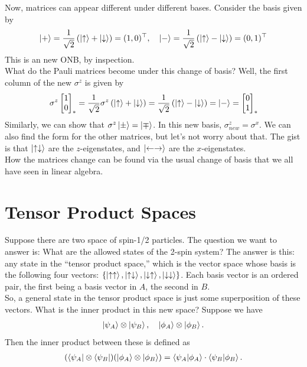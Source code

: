 \documentclass{book}
\theoremstyle{definition}
\newcommand{\f}[2]{\frac{#1}{#2}}
\newcommand{\lp}{\left(}
\newcommand{\rp}{\right)}
\begin{document}
Now, matrices can appear different under different bases. Consider the basis given by
\begin{align}
\ket{+} = \f{1}{\sqrt{2}}\lp \ket{\uparrow} + \ket{\downarrow} \rp = (1,0)^\top, \quad
\ket{-} = \f{1}{\sqrt{2}}\lp \ket{\uparrow} - \ket{\downarrow} \rp = (0,1)^\top
\end{align}
This is an new ONB, by inspection. \\
 
What do the Pauli matrices become under this change of basis? Well, the first column of the new $\sigma^z$ is given by
\begin{align}
\sigma^z\begin{bmatrix}
1\\0
\end{bmatrix}_* = \f{1}{\sqrt{2}} \sigma^z \lp \ket{\uparrow} +  \ket{\downarrow} \rp = \f{1}{\sqrt{2}}\lp \ket{\uparrow} - \ket{\downarrow} \rp  =\ket{-} = \begin{bmatrix}
0\\1
\end{bmatrix}_*
\end{align}
Similarly, we can show that $\sigma^z\ket{\pm} = \ket{\mp}$. In this new basis, $\sigma^z_{new} = \sigma^x$. We can also find the form for the other matrices, but let's not worry about that. The gist is that $\ket{\uparrow\downarrow}$ are the $z$-eigenstates, and $\ket{\leftarrow\rightarrow}$ are the $x$-eigenstates. \\

How the matrices change can be found via the usual change of basis that we all have seen in linear algebra.\\



\section{Tensor Product Spaces}

Suppose there are two space of spin-1/2 particles. The question we want to answer is: What are the allowed states of the 2-spin system? The answer is this: any state in the ``tensor product space,'' which is the vector space whose basis is the following four vectors: $\{ \ket{\uparrow\uparrow}, \ket{\uparrow\downarrow}, \ket{\downarrow\uparrow}, \ket{\downarrow\downarrow}\}$. Each basis vector is an ordered pair, the first being a basis vector in $A$, the second in $B$. \\


So, a general state in the tensor product space is just some superposition of these vectors. What is the inner product in this new space? Suppose we have
\begin{align}
\ket{\psi_A} \otimes \ket{\psi_B}, \quad \ket{\phi_A} \otimes \ket{\phi_B}.
\end{align}
Then the inner product between these is defined as 
\begin{align}
(\bra{\psi_A} \otimes \bra{\psi_B}) (\ket{\phi_A} \otimes \ket{\phi_B}) = \braket{\psi_A}{\phi_A} \cdot \braket{\psi_B}{\phi_B}.
\end{align}
\end{document}

